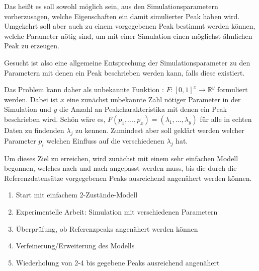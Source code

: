 Das heißt es soll sowohl möglich sein, aus den Simulationsparametern vorherzusagen, welche Eigenschaften ein damit simulierter Peak haben wird. Umgekehrt soll aber auch zu einem vorgegebenen Peak bestimmt werden können, welche Parameter nötig sind, um mit einer Simulation einen möglichst ähnlichen Peak zu erzeugen.

Gesucht ist also eine allgemeine Entsprechung der Simulationsparameter zu den Parametern mit denen ein Peak beschrieben werden kann, falls diese existiert. 

Das Problem kann daher als unbekannte Funktion : $F: [0,1] ^ x \rightarrow \mathbb{R}^y$ formuliert werden. Dabei ist $x$ eine zunächst unbekannte Zahl nötiger Parameter in der Simulation und $y$ die Anzahl an Peakcharakteristika mit denen ein Peak beschrieben wird. Schön wäre es, $F(p_1, \ldots, p_x) = (\lambda_1, \ldots, \lambda_y)$ für alle in echten Daten zu findenden $\lambda_j$ zu kennen. Zumindest aber soll geklärt werden welcher Parameter $p_i$ welchen Einfluss auf die verschiedenen $\lambda_j$ hat. 





Um dieses Ziel zu erreichen, wird zunächst mit einem sehr einfachen Modell begonnen, welches nach und nach angepasst werden muss, bis die durch die Referenzdatensätze vorgegebenen Peaks ausreichend angenähert werden können.

\begin{enumerate}
 \item Start mit einfachem 2-Zustände-Modell
 \item Experimentelle Arbeit: Simulation mit verschiedenen Parametern
 \item Überprüfung, ob Referenzpeaks angenähert werden können
 \item Verfeinerung/Erweiterung des Modells
 \item Wiederholung von 2-4 bis gegebene Peaks ausreichend angenähert
\end{enumerate}


